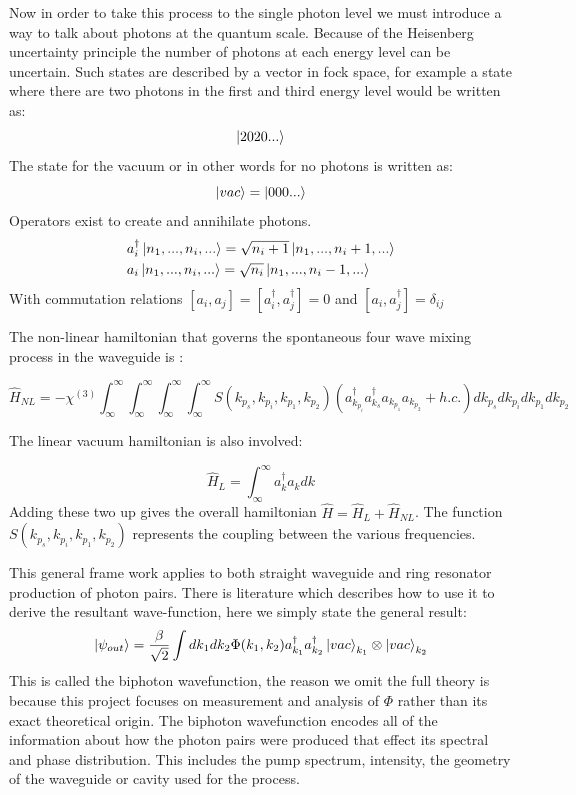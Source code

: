 Now in order to take this process to the single photon level we must introduce a way to talk about photons at the quantum scale. Because of the Heisenberg uncertainty principle the number of photons at each energy level can be uncertain. Such states are described by a vector in fock space\cite{fox_quantum_2006}, for example a state where there are two photons in the first and third energy level would be written as:
\begin{equation}
	\ket{2020...}
\end{equation}
The state for the vacuum or in other words for no photons is written as:
\begin{equation}
	\ket{vac}=\ket{000...}
\end{equation}
Operators exist to create and annihilate photons.
\begin{align}
& a_i^{\dagger}\ket{n_1,...,n_i,...}=\sqrt{n_i+1}\ket{n_1,...,n_i+1,...} \\
& a_i\ket{n_1,...,n_i,...}=\sqrt{n_i}\ket{n_1,...,n_i-1,...} \\
\end{align}
With commutation relations $[a_i,a_j]=[a^{\dagger}_i,a^{\dagger}_j]=0$ and $[a_i,a^{\dagger}_j]=\delta_{ij}$

The non-linear hamiltonian that governs the spontaneous four wave mixing process in the waveguide is \cite{liscidini_asymptotic_2012}:

\begin{equation}
\hat H_{NL} = -\chi^{(3)}\int_\infty^\infty\int_\infty^\infty\int_\infty^\infty\int_\infty^\infty S(k_{p_s},k_{p_i},k_{p_1},k_{p_2})( a_{k_{p_i}}^{\dagger}a_{k_{s}}^{\dagger}a_{k_{p_1}}a_{k_{p_2}} + h.c.)dk_{p_s}dk_{p_i}dk_{p_1}dk_{p_2}
\end{equation}

%
\noindent
The linear vacuum hamiltonian is also involved:

\begin{equation}
\hat H_{L} = \int_\infty^\infty a_{k}^{\dagger}a_{k}dk
\end{equation}
\noindent
Adding these two up gives the overall hamiltonian $\hat H = \hat H_{L} + \hat H_{NL}$. The function $S(k_{p_s},k_{p_i},k_{p_1},k_{p_2})$ represents the coupling between the various frequencies. 

This general frame work applies to both straight waveguide and ring resonator production of photon pairs. There is literature \cite{liscidini_asymptotic_2012} which describes how to use it to derive the resultant wave-function, here we simply state the general result:
\begin{equation}
\ket{\psi_{out}}=\frac{\beta}{\sqrt{2}}\int dk_1dk_2\Phi(k_1,k_2)a_{k_1}^{\dagger}a_{k_2}^{\dagger}\ket{vac}_{k_1}\otimes\ket{vac}_{k_2} \label{JSAWavefunct}
\end{equation}
This is called the biphoton wavefunction, the reason we omit the full theory is because this project focuses on measurement and analysis of $\Phi$ rather than its exact theoretical origin. The biphoton wavefunction encodes all of the information about how the photon pairs were produced that effect its spectral and phase distribution. This includes the pump spectrum, intensity, the geometry of the waveguide or cavity used for the process.

